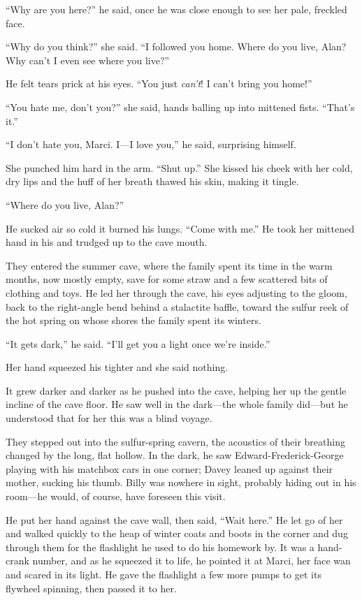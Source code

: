 ``Why are you here?'' he said, once he was close enough to see her
pale, freckled face.

``Why do you think?'' she said.  ``I followed you home.  Where do you
live, Alan?  Why can't I even see where you live?''

He felt tears prick at his eyes.  ``You just \textit{can't}!  I can't
bring you home!''

``You hate me, don't you?'' she said, hands balling up into mittened
fists.  ``That's it.''

``I don't hate you, Marci.  I---I love you,'' he said, surprising
himself.

She punched him hard in the arm.  ``Shut up.'' She kissed his cheek
with her cold, dry lips and the huff of her breath thawed his skin,
making it tingle.

``Where do you live, Alan?''

He sucked air so cold it burned his lungs.  ``Come with me.'' He took
her mittened hand in his and trudged up to the cave mouth.

They entered the summer cave, where the family spent its time in the
warm months, now mostly empty, save for some straw and a few scattered
bits of clothing and toys.  He led her through the cave, his eyes
adjusting to the gloom, back to the right-angle bend behind a
stalactite baffle, toward the sulfur reek of the hot spring on whose
shores the family spent its winters.

``It gets dark,'' he said.  ``I'll get you a light once we're
inside.''

Her hand squeezed his tighter and she said nothing.

It grew darker and darker as he pushed into the cave, helping her up
the gentle incline of the cave floor.  He saw well in the dark---the
whole family did---but he understood that for her this was a blind
voyage.

They stepped out into the sulfur-spring cavern, the acoustics of their
breathing changed by the long, flat hollow.  In the dark, he saw
Edward-Frederick-George playing with his matchbox cars in one corner;
Davey leaned up against their mother, sucking his thumb.  Billy was
nowhere in sight, probably hiding out in his room---he would, of
course, have foreseen this visit.

He put her hand against the cave wall, then said, ``Wait here.'' He
let go of her and walked quickly to the heap of winter coats and boots
in the corner and dug through them for the flashlight he used to do
his homework by.  It was a hand-crank number, and as he squeezed it to
life, he pointed it at Marci, her face wan and scared in its light. 
He gave the flashlight a few more pumps to get its flywheel spinning,
then passed it to her.

